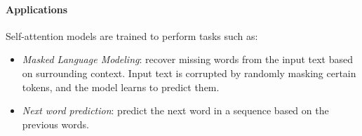 \paragraph{Applications}
Self-attention models are trained to perform tasks such as:
\begin{itemize}
    \item \textit{Masked Language Modeling}: recover missing words from the input text based on surrounding context.
        Input text is corrupted by randomly masking certain tokens, and the model learns to predict them.
    \item \textit{Next word prediction}: predict the next word in a sequence based on the previous words.
\end{itemize}